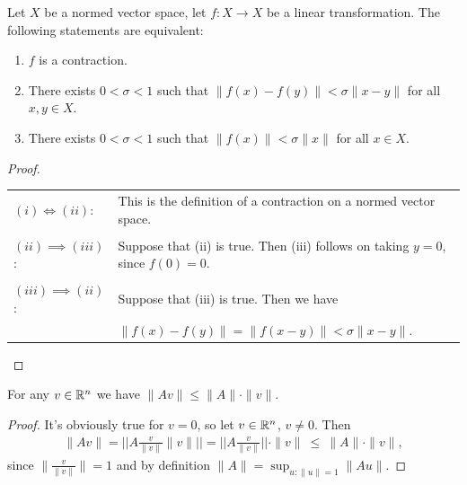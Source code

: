 \documentclass[12pt]{article}
\begin{document}
\begin{enumerate}[label=(\roman*)]
  \begin{lemma}\label{a2-2-6-lemma-1}
    Let $X$ be a normed vector space, let $f:X \to X$ be a linear transformation. The following
    statements are equivalent:
    \begin{enumerate}[label=(\roman*)]
    \item $f$ is a contraction.
    \item There exists $0 < \sigma < 1$ such that $\|f(x) - f(y)\| < \sigma \|x - y\|$ for all
      $x, y \in X$.
    \item There exists $0 < \sigma < 1$ such that $\|f(x)\| < \sigma \|x\|$ for all $x \in X$.
    \end{enumerate}
  \end{lemma}

  \begin{proof}\hspace{0pt}\\
    \begin{tabular}{ll}
      $(i) \iff (ii)$: &This is the definition of a contraction on a normed vector space.\\
      \\
      $(ii) \implies (iii)$: &Suppose that (ii) is true. Then (iii) follows on taking $y = 0$, since
                               $f(0) = 0$.\\
      \\
      $(iii) \implies (ii)$: &Suppose that (iii) is true. Then we have\\
                       & $\|f(x) - f(y)\| = \|f(x - y)\| < \sigma \|x - y\|.$
    \end{tabular}
  \end{proof}

  \begin{lemma}\label{a2-2-6-lemma-2}
    For any $v \in \mathbb{R}^n$ we have $\|Av\| \leq \|A\| \cdot \|v\|$.
  \end{lemma}

  \begin{proof}
    It's obviously true for $v = 0$, so let $v \in \mathbb{R}^n$, $v \neq 0$. Then
    \begin{align*}
      \|Av\|
      =    \Bigg|\Bigg|A \frac{v}{\|v\|} \|v\| \Bigg|\Bigg|
      =    \Bigg|\Bigg|A \frac{v}{\|v\|} \Bigg|\Bigg| \cdot \|v\|
      ~\leq~ \|A\| \cdot \|v\|,
    \end{align*}
    since $\|\frac{v}{\|v\|}\| = 1$ and by definition $\|A\| = \sup_{u: \|u\| = 1} \|Au\|$.

  \end{proof}


\end{enumerate}
\end{document}

